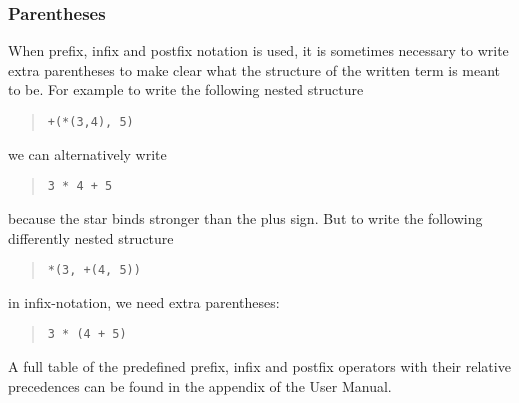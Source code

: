 \subsubsection{Parentheses} 
When prefix, infix and postfix notation is used, it is sometimes necessary to
write extra parentheses to make clear what the structure of the written
term is meant to be. For example to write the following nested structure
\begin{quote}\begin{verbatim}
+(*(3,4), 5)
\end{verbatim}\end{quote}
we can alternatively write
\begin{quote}\begin{verbatim}
3 * 4 + 5
\end{verbatim}\end{quote}
because the star binds stronger than the plus sign.
But to write the following differently nested structure
\begin{quote}\begin{verbatim}
*(3, +(4, 5))
\end{verbatim}\end{quote}
in infix-notation, we need extra parentheses:
\begin{quote}\begin{verbatim}
3 * (4 + 5)
\end{verbatim}\end{quote}
A full table of the predefined prefix, infix and postfix operators
with their relative precedences can be found in the appendix of the
User Manual.



